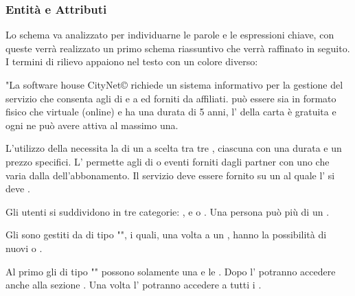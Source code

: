 \subsubsection{Entità e Attributi}
Lo schema va analizzato per individuarne le parole e le espressioni chiave, con queste verrà realizzato un primo schema riassuntivo che verrà raffinato in seguito. I termini di rilievo appaiono nel testo con un colore diverso:

\begin{adjustwidth}{}{}
"La software house CityNet© richiede un sistema informativo per la gestione del servizio  che consenta agli  di   e  a  ed  forniti da  affiliati.  può essere  sia in formato fisico che virtuale (online) e ha una durata di 5 anni, l' della carta è gratuita e ogni  ne può avere attiva al massimo una.

L'utilizzo della  necessita la  di un  a scelta tra tre , ciascuna con una durata e un prezzo specifici. L' permette agli  di   o  eventi forniti dagli  partner con uno  che varia dalla  dell'abbonamento.
Il servizio deve essere fornito su un  al quale l' si deve .

Gli utenti si suddividono in tre categorie: ,  e  o . Una persona può  più di un .

Gli  sono gestiti da  di tipo "", i quali, una volta  a un , hanno la possibilità di  nuovi  o . 

Al primo  gli  di tipo "" possono solamente  una  e  le . Dopo l' potranno accedere anche alla sezione . Una volta  l' potranno accedere a tutti i .


\end{adjustwidth}
